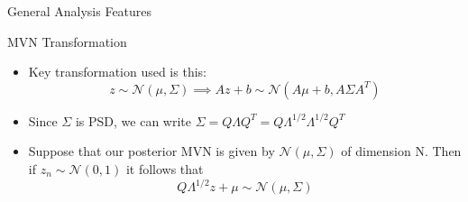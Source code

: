 \documentclass[10pt]{beamer}
\begin{document}
\begin{frame}[label=regions]{General Analysis Features}
\begin{center}
  \end{center}
\end{frame}

\begin{frame}{MVN Transformation}
  \begin{itemize}
  \item Key transformation used is this:
    \begin{equation}
      z \sim \mathcal{N} \left( \mu,\Sigma \right) \implies  A z + b \sim \mathcal{N} \left( A \mu + b , A \Sigma A^{T} \right)
    \end{equation}
  \item Since $\Sigma$ is PSD, we can write $\Sigma = Q \Lambda Q^{T} = Q \Lambda^{1/2} \Lambda^{1/2} Q^{T}$

  \item Suppose that our posterior MVN is given by $\mathcal{N} \left( \mu,\Sigma \right)$ of dimension N. Then if $z_{n} \sim \mathcal{N} \left( 0,1 \right) $ it follows that
    \begin{equation}
      Q \Lambda^{1/2} z + \mu \sim \mathcal{N} \left(  \mu ,  \Sigma \right)
    \end{equation}
  \end{itemize}
\end{frame}
\end{document}
